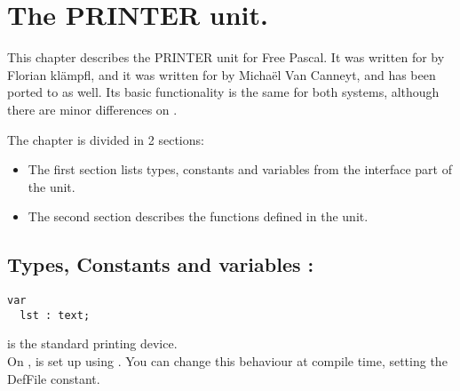 %
%
%
%
%
\chapter{The PRINTER unit.}
This chapter describes the PRINTER unit for Free Pascal. It was written for
\dos by Florian kl\"ampfl, and it was written for \linux by Micha\"el Van 
Canneyt, and has been ported to \windows as well. 
Its basic functionality is the same for both systems, although there are 
minor differences on \linux.

The chapter is divided in 2 sections:
\begin{itemize}
\item The first section lists types, constants and variables from the
interface part of the unit.
\item The second section describes the functions defined in the unit.
\end{itemize}
\section {Types, Constants and variables : }
\begin{verbatim}
var 
  lst : text;
\end{verbatim}
 is the standard printing device. \\ On \linux, 
 is set up using . 
You can change this behaviour at compile time, setting the DefFile constant.
